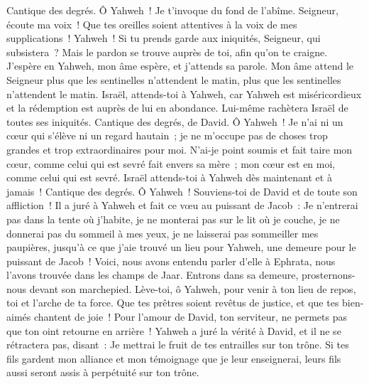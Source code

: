 \begin{multicols}{2}
\VerseOne{}Cantique des degrés. Ô Yahweh~! Je t'invoque du fond de l'abîme.
Seigneur, écoute ma voix~! Que tes oreilles soient attentives à la voix de mes supplications~!
Yahweh~! Si tu prends garde aux iniquités, Seigneur, qui subsistera~?
Mais le pardon se trouve auprès de toi, afin qu'on te craigne.
J'espère en Yahweh, mon âme espère, et j'attends sa parole.
Mon âme attend le Seigneur plus que les sentinelles n'attendent le matin, plus que les sentinelles n'attendent le matin.
Israël, attends-toi à Yahweh, car Yahweh est miséricordieux et la rédemption est auprès de lui en abondance.
Lui-même rachètera Israël de toutes ses iniquités.
\VerseOne{}Cantique des degrés, de David. Ô Yahweh~! Je n'ai ni un cœur qui s'élève ni un regard hautain~; je ne m'occupe pas de choses trop grandes et trop extraordinaires pour moi.
N'ai-je point soumis et fait taire mon cœur, comme celui qui est sevré fait envers sa mère~; mon cœur est en moi, comme celui qui est sevré.
Israël attends-toi à Yahweh dès maintenant et à jamais~!
\VerseOne{}Cantique des degrés. Ô Yahweh~! Souviens-toi de David et de toute son affliction~!
Il a juré à Yahweh et fait ce vœu au puissant de Jacob~:
Je n'entrerai pas dans la tente où j'habite, je ne monterai pas sur le lit où je couche,
je ne donnerai pas du sommeil à mes yeux, je ne laisserai pas sommeiller mes paupières,
jusqu'à ce que j'aie trouvé un lieu pour Yahweh, une demeure pour le puissant de Jacob~!
Voici, nous avons entendu parler d'elle à Ephrata, nous l'avons trouvée dans les champs de Jaar.
Entrons dans sa demeure, prosternons-nous devant son marchepied.
Lève-toi, ô Yahweh, pour venir à ton lieu de repos, toi et l'arche de ta force.
Que tes prêtres soient revêtus de justice, et que tes bien-aimés chantent de joie~!
Pour l'amour de David, ton serviteur, ne permets pas que ton oint retourne en arrière~!
Yahweh a juré la vérité à David, et il ne se rétractera pas, disant~: Je mettrai le fruit de tes entrailles sur ton trône.
Si tes fils gardent mon alliance et mon témoignage que je leur enseignerai, leurs fils aussi seront assis à perpétuité sur ton trône.

\end{multicols}
